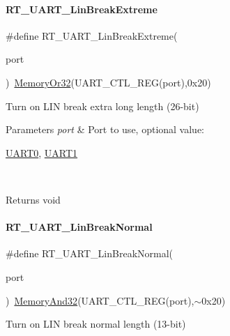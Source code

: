 \paragraph{\texorpdfstring{R\+T\+\_\+\+U\+A\+R\+T\+\_\+\+Lin\+Break\+Extreme}{RT\_UART\_LinBreakExtreme}}
{\footnotesize\ttfamily \#define R\+T\+\_\+\+U\+A\+R\+T\+\_\+\+Lin\+Break\+Extreme(\begin{DoxyParamCaption}\item[{}]{port }\end{DoxyParamCaption})~\mbox{\hyperlink{a00026_a27874a97deab7cecdde5ddecf466e31e}{Memory\+Or32}}(U\+A\+R\+T\+\_\+\+C\+T\+L\+\_\+\+R\+EG(port),0x20)}



Turn on L\+IN break extra long length (26-\/bit) 


\begin{DoxyParams}{Parameters}
{\em port} & Port to use, optional value\+:
\begin{DoxyCode}
\mbox{\hyperlink{a00098_a0508661f121639ffdee7de2353a0def2}{UART0}}, \mbox{\hyperlink{a00098_a8d69bf04d07af4fbbab5a8bd291f65ff}{UART1}}
\end{DoxyCode}
 \\
\hline
\end{DoxyParams}
\begin{DoxyReturn}{Returns}
void 
\end{DoxyReturn}
\mbox{\label{a00098_a45d1e1116c5b535f276acc73e522570f}} 
\paragraph{\texorpdfstring{R\+T\+\_\+\+U\+A\+R\+T\+\_\+\+Lin\+Break\+Normal}{RT\_UART\_LinBreakNormal}}
{\footnotesize\ttfamily \#define R\+T\+\_\+\+U\+A\+R\+T\+\_\+\+Lin\+Break\+Normal(\begin{DoxyParamCaption}\item[{}]{port }\end{DoxyParamCaption})~\mbox{\hyperlink{a00026_ad87cedffcaadc51db22594fce55173d4}{Memory\+And32}}(U\+A\+R\+T\+\_\+\+C\+T\+L\+\_\+\+R\+EG(port),$\sim$0x20)}



Turn on L\+IN break normal length (13-\/bit) 


